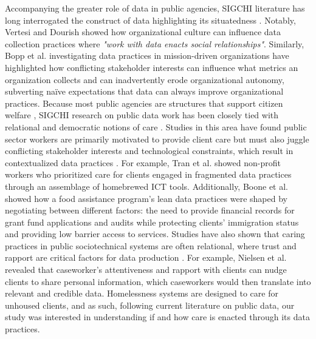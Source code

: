 Accompanying the greater role of data in public agencies, SIGCHI literature has long interrogated the construct of data highlighting its situatedness \cite{vertesi2011, Bopp_Harmon_Voida_2017, Koesten_2019, Feinberg_2017, Muller_2019_howdsworks, pine2015, chen_covid23, kapania_data23}. Notably, Vertesi and Dourish \cite{vertesi2011} showed how organizational culture can influence data collection practices where \textit{"work with data enacts social relationships"}. Similarly, Bopp et al. \cite{Bopp_Harmon_Voida_2017} investigating data practices in mission-driven organizations have highlighted how conflicting stakeholder interests can influence what metrics an organization collects and can inadvertently erode organizational autonomy, subverting naïve expectations that data can always improve organizational practices. Because most public agencies are structures that support citizen welfare \cite{Light2019}, SIGCHI research on public data work has been closely tied with relational and democratic notions of care \cite{Gilligan_2003, Tronto_2013, mol2010}. Studies in this area have found public sector workers are primarily motivated to provide client care but must also juggle conflicting stakeholder interests and technological constraints, which result in contextualized data practices \cite{boone2023, tran2022, nielsen2023, karusala19, saxena2021framework2, Holtenshifting_2020, slota23}. For example, Tran et al. \cite{tran2022} showed non-profit workers who prioritized care for clients engaged in fragmented data practices through an assemblage of homebrewed ICT tools. Additionally, Boone et al. \cite{boone2023} showed how a food assistance program's lean data practices were shaped by negotiating between different factors: the need to provide financial records for grant fund applications and audits while protecting clients' immigration status and providing low barrier access to services. Studies have also shown that caring practices in public sociotechnical systems are often relational, where trust and rapport are critical factors for data production \cite{karusala19, nielsen2023}. For example, Nielsen et al. \cite{nielsen2023} revealed that caseworker's attentiveness and rapport with clients can nudge clients to share personal information, which caseworkers would then translate into relevant and credible data. Homelessness systems are designed to care for unhoused clients, and as such, following current literature on public data, our study was interested in understanding if and how care is enacted through its data practices. 

